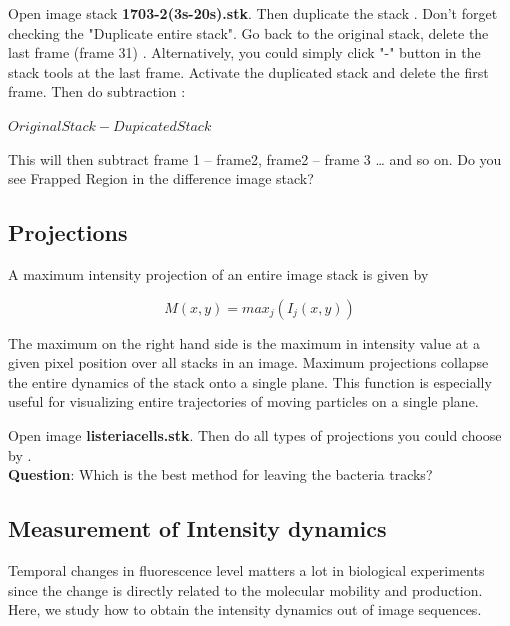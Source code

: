 \begin{indentexercise}{1}
Open image stack \textbf{1703-2(3s-20s).stk}.
Then duplicate the stack .
Don't forget checking the "Duplicate entire stack". 
Go back to the original stack, delete the last frame (frame 31) . Alternatively, you could simply click "-" button in the stack tools at the last frame. 
Activate the duplicated stack and delete the first frame.
Then do subtraction :

\tab $Original Stack - Dupicated Stack$

This will then subtract frame 1 -- frame2, frame2 -- frame 3 \ldots
and so on. Do you see Frapped Region in the difference image stack?
\end{indentexercise}

\subsection{Projections}

A maximum intensity projection of an entire image stack is given by

\begin{equation}
M(x,y) =max_{j}(I_{j}(x,y))
\end{equation}

The maximum on the right hand side is the maximum in intensity value at
a given pixel position over all stacks in an image. Maximum
projections collapse the entire dynamics of the stack onto a single
plane. This function is especially useful for visualizing entire
trajectories of moving particles on a single plane.

\begin{indentexercise}{1}
Open image \textbf{listeriacells.stk}.
Then do all types of projections you could choose by .\\
\textbf{Question}: Which is the best method for leaving the bacteria tracks?
\end{indentexercise}

\subsection{Measurement of Intensity dynamics}

Temporal changes in fluorescence level matters a lot in biological
experiments since the change is directly related to the molecular
mobility and production. Here, we study how to obtain the intensity
dynamics out of image sequences.

